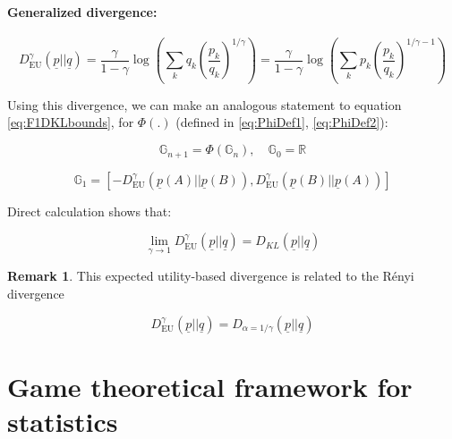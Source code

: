 \documentclass{article}
\theoremstyle{definition}
\newtheorem*{remark}{Remark}
\begin{document}
\paragraph{Generalized divergence:}

\begin{equation}
    D_\mathrm{EU}^\gamma(\underline{p}||\underline{q}) =
    \frac{\gamma}{1-\gamma}
    \log
    \left (
    \sum_k q_k 
    \left (
    \frac{p_k}{q_k}
    \right )^{1/\gamma}
    \right )
    =
    \frac{\gamma}{1-\gamma}
    \log
    \left (
    \sum_k p_k 
    \left (
    \frac{p_k}{q_k}
    \right )^{1/\gamma-1}
    \right )
\end{equation}

Using this divergence, we can make an analogous statement to equation \eqref{eq:F1DKLbounds}, for $\Phi(.)$ (defined in \eqref{eq:PhiDef1}, \eqref{eq:PhiDef2}):

\begin{equation}
    \mathbb{G}_{n+1} = \Phi(\mathbb{G}_n),
    \quad \mathbb{G}_0 = \mathbb{R}
\end{equation}

\begin{equation}
    \mathbb{G}_1 = [
    -D_\mathrm{EU}^\gamma(\underline{p}(A)||\underline{p}(B)),
    D_\mathrm{EU}^\gamma(\underline{p}(B)||\underline{p}(A))
    ]
\end{equation}

Direct calculation shows that:

\begin{equation}
    \lim_{\gamma \to 1}
    D_\mathrm{EU}^\gamma(\underline{p}||\underline{q}) =
    D_{KL}(\underline{p}||\underline{q})
\end{equation}

\begin{remark}
    This expected utility-based divergence is related to the Rényi divergence \cite{arxiv:RenyiAndKLDivergence,paper:RenyiOriginal}

    \begin{equation}
        D_\mathrm{EU}^\gamma(\underline{p}||\underline{q}) =
        D_{\alpha=1/\gamma}(\underline{p}||\underline{q})
    \end{equation}

\end{remark}


\section{Game theoretical framework for statistics}
\label{sec:PhilosophiPart}
\end{document}

